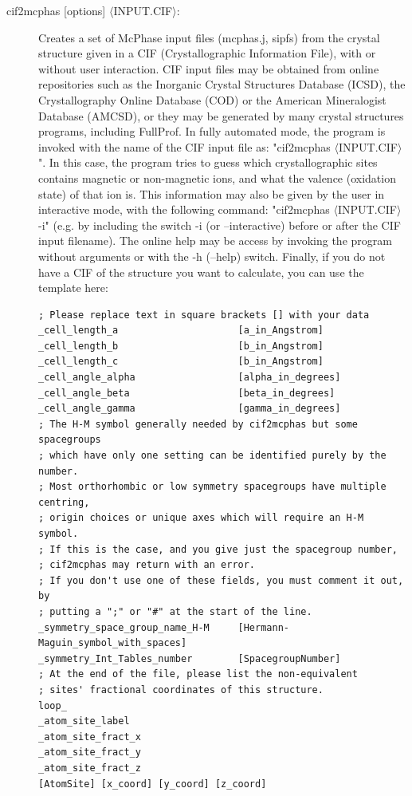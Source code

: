 \begin{description}
\item [\prg cif2mcphas {[options]} $\langle$INPUT.CIF$\rangle$:] 
Creates a set of McPhase input files (mcphas.j, sipfs) from the crystal structure given in a CIF 
(Crystallographic Information File), with or without user interaction. CIF input files may be obtained 
from online repositories such as the Inorganic Crystal Structures Database (ICSD), the Crystallography 
Online Database (COD) or the American Mineralogist Database (AMCSD), or they may be generated by many 
crystal structures programs, including FullProf. In fully automated mode, the program is invoked with 
the name of the CIF input file as: "{\prg cif2mcphas $\langle$INPUT.CIF$\rangle$}". In this case, the
program tries to guess which crystallographic sites contains magnetic or non-magnetic ions, and what the 
valence (oxidation state) of that ion is. This information may also be given by the user in interactive
mode, with the following command: "{\prg cif2mcphas $\langle$INPUT.CIF$\rangle$ -i}" (e.g. by including
the switch {\prg -i} (or {\prg --interactive}) before or after the CIF input filename). The online help
may be access by invoking the program without arguments or with the {\prg -h} ({\prg --help}) switch.
Finally, if you do not have a CIF of the structure you want to calculate, you can use the template here:

\begin{verbatim}
; Please replace text in square brackets [] with your data
_cell_length_a                     [a_in_Angstrom]
_cell_length_b                     [b_in_Angstrom]
_cell_length_c                     [b_in_Angstrom]
_cell_angle_alpha                  [alpha_in_degrees]
_cell_angle_beta                   [beta_in_degrees]
_cell_angle_gamma                  [gamma_in_degrees]
; The H-M symbol generally needed by cif2mcphas but some spacegroups
; which have only one setting can be identified purely by the number.
; Most orthorhombic or low symmetry spacegroups have multiple centring,
; origin choices or unique axes which will require an H-M symbol.
; If this is the case, and you give just the spacegroup number,
; cif2mcphas may return with an error.
; If you don't use one of these fields, you must comment it out, by
; putting a ";" or "#" at the start of the line.
_symmetry_space_group_name_H-M     [Hermann-Maguin_symbol_with_spaces]
_symmetry_Int_Tables_number        [SpacegroupNumber]
; At the end of the file, please list the non-equivalent
; sites' fractional coordinates of this structure.
loop_
_atom_site_label
_atom_site_fract_x
_atom_site_fract_y
_atom_site_fract_z
[AtomSite] [x_coord] [y_coord] [z_coord]
\end{verbatim}


\end{description}
